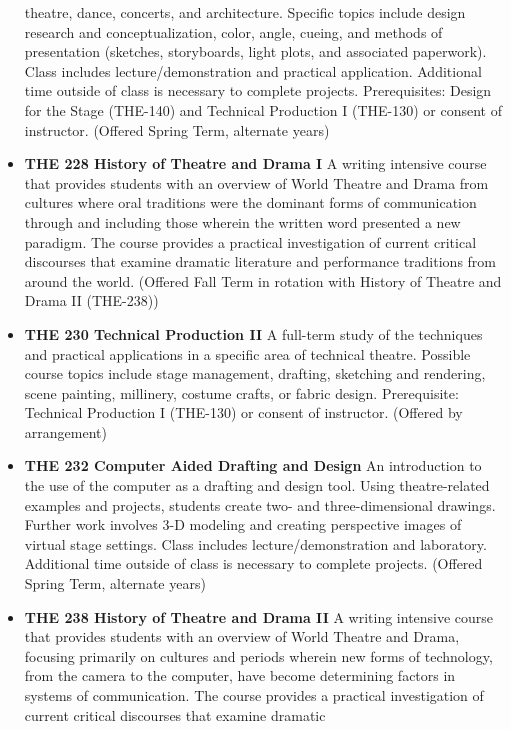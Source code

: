 \documentclass[
  letterpaper,
]{scrbook}
\begin{document}
\begin{itemize}
  theatre, dance, concerts, and architecture. Specific topics include
  design research and conceptualization, color, angle, cueing, and
  methods of presentation (sketches, storyboards, light plots, and
  associated paperwork). Class includes lecture/demonstration and
  practical application. Additional time outside of class is necessary
  to complete projects. Prerequisites: Design for the Stage (THE-140)
  and Technical Production I (THE-130) or consent of instructor.
  (Offered Spring Term, alternate years)\\
\item
  \textbf{THE 228 History of Theatre and Drama I} A writing intensive
  course that provides students with an overview of World Theatre and
  Drama from cultures where oral traditions were the dominant forms of
  communication through and including those wherein the written word
  presented a new paradigm. The course provides a practical
  investigation of current critical discourses that examine dramatic
  literature and performance traditions from around the world. (Offered
  Fall Term in rotation with History of Theatre and Drama II (THE-238))
\item
  \textbf{THE 230 Technical Production II} A full-term study of the
  techniques and practical applications in a specific area of technical
  theatre. Possible course topics include stage management, drafting,
  sketching and rendering, scene painting, millinery, costume crafts, or
  fabric design. Prerequisite: Technical Production I (THE-130) or
  consent of instructor. (Offered by arrangement)\\
\item
  \textbf{THE 232 Computer Aided Drafting and Design} An introduction to
  the use of the computer as a drafting and design tool. Using
  theatre-related examples and projects, students create two- and
  three-dimensional drawings. Further work involves 3-D modeling and
  creating perspective images of virtual stage settings. Class includes
  lecture/demonstration and laboratory. Additional time outside of class
  is necessary to complete projects. (Offered Spring Term, alternate
  years)
\item
  \textbf{THE 238 History of Theatre and Drama II} A writing intensive
  course that provides students with an overview of World Theatre and
  Drama, focusing primarily on cultures and periods wherein new forms of
  technology, from the camera to the computer, have become determining
  factors in systems of communication. The course provides a practical
  investigation of current critical discourses that examine dramatic

\end{itemize}
\end{document}
